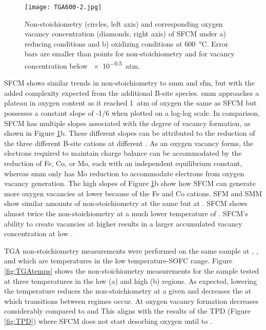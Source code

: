    \begin{figure}[p]
      \texttt{[image: TGA600-2.jpg]}
      \caption{Non-stoichiometry (circles, left axis) and corresponding oxygen vacancy concentration (diamonds, right axis) of SFCM under a) reducing conditions and b) oxidizing conditions at \SI{600}{\celsius}. Error bars are smaller than points for non-stoichiometry and for vacancy concentration below \SI{e-0.5}{atm}.}
      \label{fig:TGA600}
    \end{figure}

    SFCM shows similar trends in non-stoichiometry to \gls{smm} and \gls{sfm}, but with the added complexity expected from the additional B-site species.
    \gls{smm} approaches a plateau in oxygen content as it reached \SI{1}{atm} of oxygen the same as SFCM but possesses a constant slope of -1/6 when plotted on a log-log scale.\cite{Marrero-lopez2010}
    In comparison, SFCM has multiple slopes associated with the degree of vacancy formation, as shown in Figure \ref{fig:TGA600}b.
    These different slopes can be attributed to the reduction of the three different B-site cations at different .
    As an oxygen vacancy forms, the electrons required to maintain charge balance can be accommodated by the reduction of Fe, Co, or Mo, each with an independent equilibrium constant, whereas \gls{smm} only has Mo reduction to accommodate electrons from oxygen vacancy generation.
    The high slopes of Figure \ref{fig:TGA600}b show how SFCM can generate more oxygen vacancies at lower  because of the Fe and Co cations.
    SFM and SMM show similar amounts of non-stoichiometry at the same  but at .\cite{Kircheisen2012}
    SFCM shows almost twice the non-stoichiometry at a much lower temperature of .
    SFCM's ability to create vacancies at higher  results in a larger accumulated vacancy concentration at low .

    TGA non-stoichiometry measurements were performed on the same sample at ,  , and  which are temperatures in the low temperature-SOFC range.
    Figure \ref{fig:TGAtemps} shows the non-stoichiometry measurements for the sample  tested at three temperatures in the low  (a) and high  (b) regions.
    As expected, lowering the temperature reduces the non-stoichiometry at a given  and decreases the  at which transitions between regimes occur.
    At  oxygen vacancy formation decreases considerably compared to  and 
    This aligns with the results of the TPD (Figure \ref{fig:TPD}) where SFCM does not start desorbing oxygen until  to .

